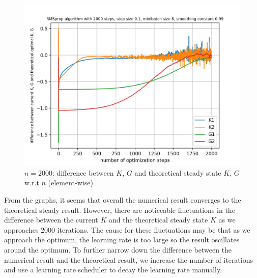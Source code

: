 \documentclass{article}
\begin{document}
\begin{figure}[h!]
\begin{minipage}[t]{.27\paperwidth}
		\centering
		\includegraphics[width=1.0\textwidth]{Figures/diff_2000_sep.png}
		\caption{$n=2000$: difference between $K$, $G$ and theoretical steady state $K$, $G$ w.r.t $n$ (element-wise)\label{fig:diff_2000_sep}}
	\end{minipage}
\end{figure}

\noindent From the graphs, it seems that overall the numerical result converges to the theoretical steady result. However, there are noticeable fluctuations in the difference between the current $K$ and the theoretical steady state $K$ as we approaches 2000 iterations. The cause for these fluctuations may be that as we approach the optimum, the learning rate is too large so the result oscillates around the optimum. To further narrow down the difference between the numerical result and the theoretical result, we increase the number of iterations and use a learning rate scheduler to decay the learning rate manually. 
\end{document}
